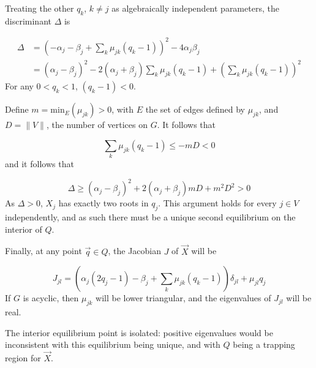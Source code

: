 \documentclass{article}
\begin{document}
Treating the other $q_k$, $k \neq j$ as algebraically independent parameters,
the discriminant $\Delta$ is

\begin{align}
    \Delta &= (-\alpha_j -\beta_j + \sum_k \mu_{jk} (q_k - 1))^2 - 4\alpha_j \beta_j
    \nonumber \\
    &= (\alpha_j - \beta_j)^2 - 2 (\alpha_j + \beta_j) \sum_k \mu_{jk} (q_k - 1)
    +(\sum_k \mu_{jk} (q_k - 1))^2
\end{align}
For any $0 < q_k < 1$, $(q_k - 1) < 0$.

Define $m = \mathrm{min}_E(\mu_{jk}) > 0$, with $E$ the set of edges defined by
$\mu_{jk}$, and $D = \|V\|$, the number of vertices on $G$. It follows that

\begin{equation}
    \sum_k \mu_{jk} (q_k - 1) \leq - m D < 0
\end{equation}
and it follows that

\begin{equation}
    \Delta \geq (\alpha_j - \beta_j)^2 + 2 (\alpha_j + \beta_j) m D + m^2 D^2 > 0
\end{equation}
As $\Delta > 0$, $X_j$ has exactly two roots in $q_j$. This argument holds for every
$j \in V$ independently, and as such there must be a unique second equilibrium on the
interior of $Q$.


Finally, at any point $\vec{q} \in Q$, the Jacobian $J$ of $\vec{X}$ will be

\begin{equation}
    J_{jl} = \left(\alpha_j (2 q_j - 1) - \beta_j + \sum_k \mu_{jk} (q_k - 1)
    \right) \delta_{jl} + \mu_{jl} q_j
\end{equation}
If $G$ is acyclic, then $\mu_{jk}$ will be lower triangular, and the eigenvalues
of $J_{jl}$ will be real.

The interior equilibrium point is isolated: positive eigenvalues would be
inconsistent with this equilibrium being unique, and with $Q$ being a trapping
region for $\vec{X}$. 
\end{document}
